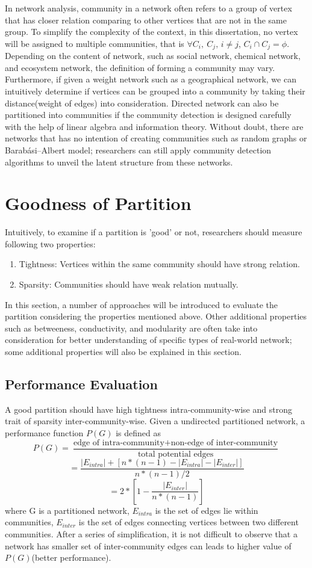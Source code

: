 \documentclass[12pt]{article}
\begin{document}
In network analysis, community in a network often refers to a group of vertex that has closer relation comparing to other vertices that are not in the same group. To simplify the complexity of the context, in this dissertation, no vertex will be assigned to multiple communities, that is $\forall C_i,\ C_j \text{, } i \neq j$, $C_i \cap C_j = \phi$. Depending on the content of network, such as social network, chemical network, and ecosystem network, the definition of forming a community may vary. Furthermore, if given a weight network such as a geographical network, we can intuitively determine if vertices can be grouped into a community by taking their distance(weight of edges) into consideration. Directed network can also be partitioned into communities if the community detection is designed carefully with the help of linear algebra and information theory\cite{4}. Without doubt, there are networks that has no intention of creating communities such as random graphs or Barabási–Albert model\cite{5}; researchers can still apply community detection algorithms to unveil the latent structure from these networks.

\section{Goodness of Partition}

Intuitively, to examine if a partition is 'good' or not, researchers should measure following two properties: 
\begin{enumerate}[label=(\alph*)]
\item Tightness: Vertices within the same community should have strong relation.
\item Sparsity: Communities should have weak relation mutually.
\end{enumerate}

In this section, a number of approaches will be introduced to evaluate the partition considering the properties mentioned above. Other additional properties such as betweeness, conductivity, and modularity are often take into consideration for better understanding of specific types of real-world network\cite{7,8}; some additional properties will also be explained in this section.

\subsection{Performance Evaluation}
A good partition should have high tightness intra-community-wise and strong trait of sparsity inter-community-wise. Given a undirected partitioned network, a performance function $P(G)$ is defined as
$$P(G) = \frac{\text{edge of intra-community} + \text{non-edge of inter-community}}{\text{total potential edges}}$$
$$=\frac{|E_{intra}| + [n*(n-1) - |E_{intra}| - |E_{inter}|]}{n*(n-1)/2}$$
$$=2*\left[ 1 - \frac{ |E_{inter}| } { n*\left( n-1 \right) }  \right]$$
where G is a partitioned network, $E_{intra}$ is the set of edges lie within communities, $E_{inter}$ is the set of edges connecting vertices between two different communities. After a series of simplification, it is not difficult to observe that a network has smaller set of inter-community edges can leads to higher value of $P(G)$(better performance)\cite{7}.
\end{document}
